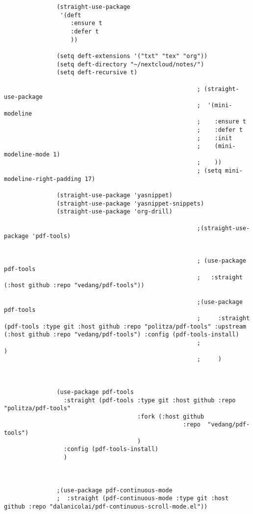 \documentclass[11pt]{article}
\begin{document}
\begin{verbatim}
               (straight-use-package 
                '(deft
                   :ensure t
                   :defer t
                   ))

               (setq deft-extensions '("txt" "tex" "org"))
               (setq deft-directory "~/nextcloud/notes/")
               (setq deft-recursive t)

                                                       ; (straight-use-package 
                                                       ;  '(mini-modeline
                                                       ;    :ensure t
                                                       ;    :defer t
                                                       ;    :init
                                                       ;    (mini-modeline-mode 1)
                                                       ;    ))
                                                       ; (setq mini-modeline-right-padding 17)

               (straight-use-package 'yasnippet)
               (straight-use-package 'yasnippet-snippets)
               (straight-use-package 'org-drill) 

                                                       ;(straight-use-package 'pdf-tools)


                                                       ; (use-package pdf-tools
                                                       ;   :straight (:host github :repo "vedang/pdf-tools"))

                                                       ;(use-package pdf-tools
                                                       ;	 :straight (pdf-tools :type git :host github :repo "politza/pdf-tools" :upstream (:host github :repo "vedang/pdf-tools") :config (pdf-tools-install)
                                                       ;			      )
                                                       ;	 )



               (use-package pdf-tools
                 :straight (pdf-tools :type git :host github :repo "politza/pdf-tools"
                                      :fork (:host github
                                                   :repo  "vedang/pdf-tools")
                                      )
                 :config (pdf-tools-install)
                 )



               ;(use-package pdf-continuous-mode
               ;  :straight (pdf-continuous-mode :type git :host github :repo "dalanicolai/pdf-continuous-scroll-mode.el"))


\end{verbatim}
\end{document}
